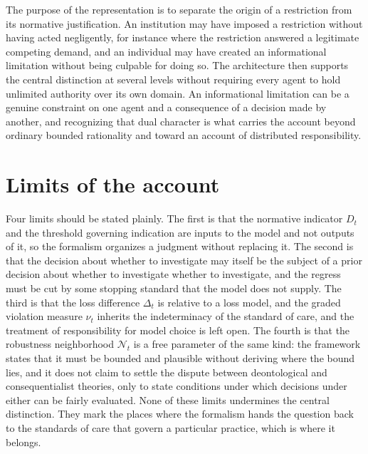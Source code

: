 \documentclass[11pt]{article}
\theoremstyle{definition}
\begin{document}
The purpose of the representation is to separate the origin of a restriction from its normative justification. An institution may have imposed a restriction without having acted negligently, for instance where the restriction answered a legitimate competing demand, and an individual may have created an informational limitation without being culpable for doing so. The architecture then supports the central distinction at several levels without requiring every agent to hold unlimited authority over its own domain. An informational limitation can be a genuine constraint on one agent and a consequence of a decision made by another, and recognizing that dual character is what carries the account beyond ordinary bounded rationality and toward an account of distributed responsibility.

\section{Limits of the account}

Four limits should be stated plainly. The first is that the normative indicator $D_t$ and the threshold governing indication are inputs to the model and not outputs of it, so the formalism organizes a judgment without replacing it. The second is that the decision about whether to investigate may itself be the subject of a prior decision about whether to investigate whether to investigate, and the regress must be cut by some stopping standard that the model does not supply. The third is that the loss difference $\Delta_t$ is relative to a loss model, and the graded violation measure $\nu_t$ inherits the indeterminacy of the standard of care, and the treatment of responsibility for model choice is left open. The fourth is that the robustness neighborhood $\mathcal N_t$ is a free parameter of the same kind: the framework states that it must be bounded and plausible without deriving where the bound lies, and it does not claim to settle the dispute between deontological and consequentialist theories, only to state conditions under which decisions under either can be fairly evaluated. None of these limits undermines the central distinction. They mark the places where the formalism hands the question back to the standards of care that govern a particular practice, which is where it belongs.
\end{document}
